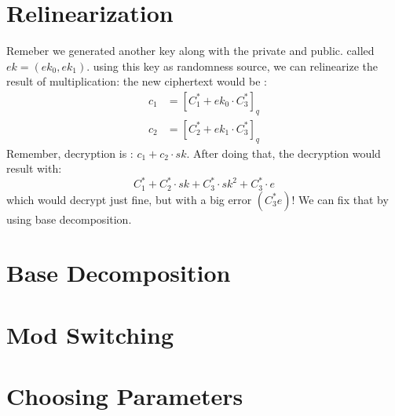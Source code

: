 \section{Relinearization}

Remeber we generated another key along with the private and public.
called $ek=\left(ek_{0},ek_{1}\right)$. using this key as randomness
source, we can relinearize the result of multiplication: the new ciphertext
would be :
\begin{align*}
c_{1} & =\left[C_{1}^{*}+ek_{0}\cdot C_{3}^{*}\right]_{q}\\
c_{2} & =\left[C_{2}^{*}+ek_{1}\cdot C_{3}^{*}\right]_{q}
\end{align*}
Remember, decryption is : $c_{1}+c_{2}\cdot sk$. After doing that,
the decryption would result with: 
\[
C_{1}^{*}+C_{2}^{*}\cdot sk+C_{3}^{*}\cdot sk^{2}+C_{3}^{*}\cdot e
\]
 which would decrypt just fine, but with a big error $\left(C_{3}^{*}e\right)$!
We can fix that by using base decomposition.


\section{Base Decomposition}
\section{Mod Switching}

\section{Choosing Parameters}

